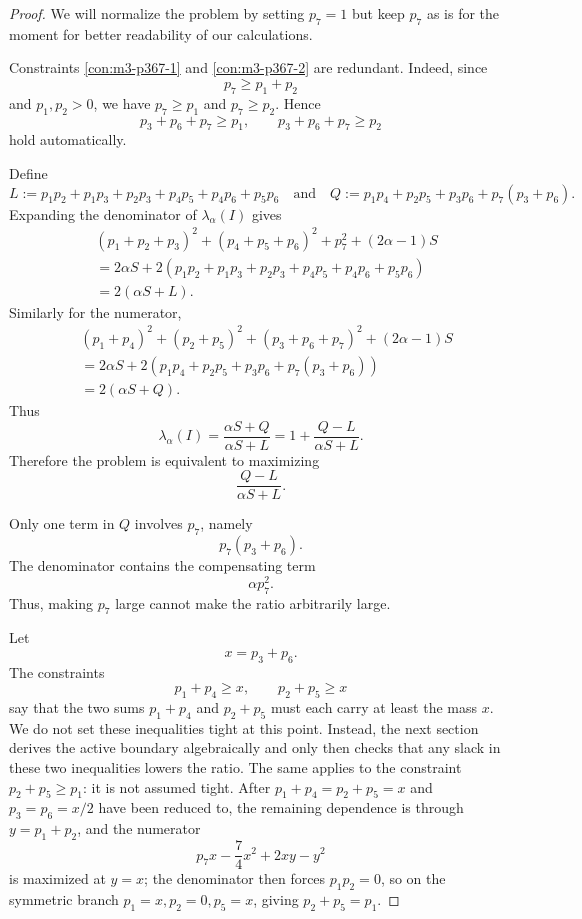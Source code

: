 \documentclass[11pt]{article}
\begin{document}
\begin{proof}
We will normalize the problem by setting
$p_7=1$
but keep $p_7$ as is for the moment for better readability of our calculations.

Constraints \eqref{con:m3-p367-1} and \eqref{con:m3-p367-2} are redundant. Indeed, since
\[
p_7\ge p_1+p_2
\]
and \(p_1,p_2>0\), we have \(p_7\ge p_1\) and \(p_7\ge p_2\). Hence
\[
p_3+p_6+p_7\ge p_1,\qquad p_3+p_6+p_7\ge p_2
\]
hold automatically.



Define
\[
L:=p_1p_2+p_1p_3+p_2p_3+p_4p_5+p_4p_6+p_5p_6
\quad \text{and}\quad
Q:=p_1p_4+p_2p_5+p_3p_6+p_7(p_3+p_6).
\]
Expanding the denominator of $\lambda_{\alpha}(I)$ gives
\[
\begin{aligned}
& (p_1+p_2+p_3)^2+(p_4+p_5+p_6)^2+p_7^2+(2\alpha-1)S\\
&=
2\alpha S+2(p_1p_2+p_1p_3+p_2p_3+p_4p_5+p_4p_6+p_5p_6)\\
&=
2(\alpha S+L).
\end{aligned}
\]
Similarly for the numerator,
\[
\begin{aligned}
& (p_1+p_4)^2+(p_2+p_5)^2+(p_3+p_6+p_7)^2+(2\alpha-1)S\\
&=
2\alpha S+2(p_1p_4+p_2p_5+p_3p_6+p_7(p_3+p_6))\\
&=
2(\alpha S+Q).
\end{aligned}
\]
Thus
\[
\lambda_{\alpha}(I)
=
\frac{\alpha S+Q}{\alpha S+L}
=
1+\frac{Q-L}{\alpha S+L}.
\]
Therefore the problem is equivalent to maximizing
\[
\frac{Q-L}{\alpha S+L}.
\]

Only one term in \(Q\) involves \(p_7\), namely
\[
p_7(p_3+p_6).
\]
The denominator contains the compensating term
\[
\alpha p_7^2.
\]
Thus, making \(p_7\) large cannot make the ratio
arbitrarily large.

Let
\[
x=p_3+p_6.
\]
The constraints
\[
p_1+p_4\ge x,\qquad p_2+p_5\ge x
\]
say that the two sums \(p_1+p_4\) and \(p_2+p_5\) must each carry at least the
mass \(x\).  We do not set these inequalities tight at this point.
Instead, the next section derives the active boundary algebraically and
only then checks that any slack in these two inequalities lowers the
ratio.
The same applies to the constraint \(p_2+p_5\ge p_1\): it is not assumed
tight.  After \(p_1+p_4=p_2+p_5=x\) and \(p_3=p_6=x/2\) have been reduced to,
the remaining dependence is through \(y=p_1+p_2\), and the numerator
\[
p_7x-\frac74x^2+2xy-y^2
\]
is maximized at \(y=x\); the denominator then forces \(p_1p_2=0\), so on
the symmetric branch \(p_1=x,p_2=0,p_5=x\), giving \(p_2+p_5=p_1\).



\end{proof}
\end{document}
